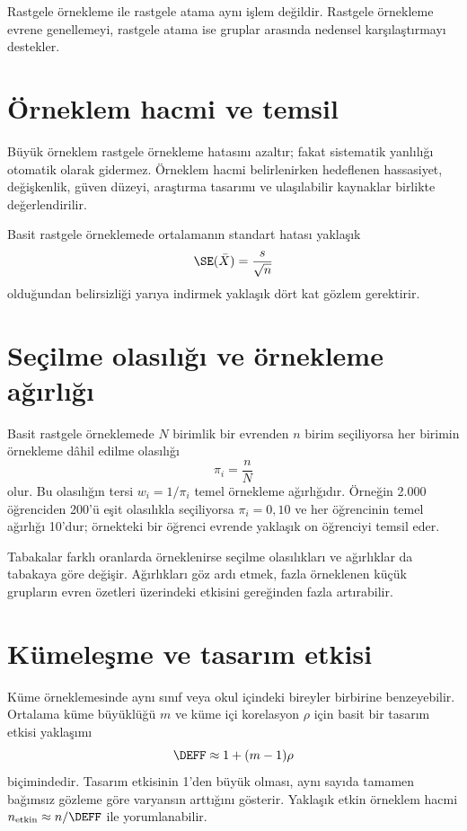 \begin{mistakebox}
Rastgele örnekleme ile rastgele atama aynı işlem değildir. Rastgele örnekleme
evrene genellemeyi, rastgele atama ise gruplar arasında nedensel karşılaştırmayı
destekler.
\end{mistakebox}

\section{Örneklem hacmi ve temsil}

Büyük örneklem rastgele örnekleme hatasını azaltır; fakat sistematik yanlılığı
otomatik olarak gidermez. Örneklem hacmi belirlenirken hedeflenen hassasiyet,
değişkenlik, güven düzeyi, araştırma tasarımı ve ulaşılabilir kaynaklar birlikte
değerlendirilir.

Basit rastgele örneklemede ortalamanın standart hatası yaklaşık
\[
\SE(\bar X)=\frac{s}{\sqrt n}
\]
olduğundan belirsizliği yarıya indirmek yaklaşık dört kat gözlem gerektirir.

\section{Seçilme olasılığı ve örnekleme ağırlığı}
\label{sec:sampling-weights}

Basit rastgele örneklemede $N$ birimlik bir evrenden $n$ birim seçiliyorsa her
birimin örnekleme dâhil edilme olasılığı
\[
\pi_i=\frac{n}{N}
\]
olur. Bu olasılığın tersi $w_i=1/\pi_i$ temel örnekleme ağırlığıdır. Örneğin
2.000 öğrenciden 200'ü eşit olasılıkla seçiliyorsa $\pi_i=0{,}10$ ve her
öğrencinin temel ağırlığı 10'dur; örnekteki bir öğrenci evrende yaklaşık on
öğrenciyi temsil eder.

Tabakalar farklı oranlarda örneklenirse seçilme olasılıkları ve ağırlıklar da
tabakaya göre değişir. Ağırlıkları göz ardı etmek, fazla örneklenen küçük
grupların evren özetleri üzerindeki etkisini gereğinden fazla artırabilir.

\section{Kümeleşme ve tasarım etkisi}
\label{sec:sampling-deff}

Küme örneklemesinde aynı sınıf veya okul içindeki bireyler birbirine
benzeyebilir. Ortalama küme büyüklüğü $m$ ve küme içi korelasyon $\rho$ için
basit bir tasarım etkisi yaklaşımı
\[
\DEFF\approx1+(m-1)\rho
\]
biçimindedir. Tasarım etkisinin 1'den büyük olması, aynı sayıda tamamen
bağımsız gözleme göre varyansın arttığını gösterir. Yaklaşık etkin örneklem
hacmi $n_{\mathrm{etkin}}\approx n/\DEFF$ ile yorumlanabilir.

